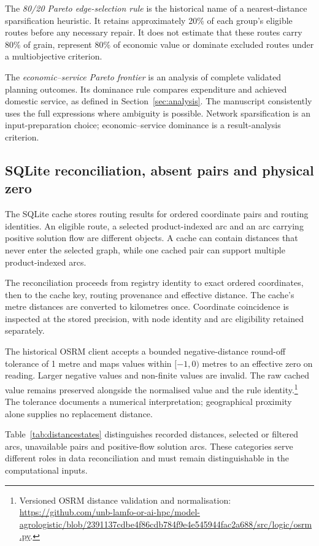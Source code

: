 \documentclass[11pt,a4paper]{article}
\newcommand{\technical}[2]{\footnote{#1: \url{#2}.}}
\begin{document}
The \emph{80/20 Pareto edge-selection rule} is the historical name of a nearest-distance sparsification heuristic. It retains approximately 20\% of each group's eligible routes before any necessary repair. It does not estimate that these routes carry 80\% of grain, represent 80\% of economic value or dominate excluded routes under a multiobjective criterion.

The \emph{economic--service Pareto frontier} is an analysis of complete validated planning outcomes. Its dominance rule compares expenditure and achieved domestic service, as defined in Section~\ref{sec:analysis}. The manuscript consistently uses the full expressions where ambiguity is possible. Network sparsification is an input-preparation choice; economic--service dominance is a result-analysis criterion.

\subsection{SQLite reconciliation, absent pairs and physical zero}

The SQLite cache stores routing results for ordered coordinate pairs and routing identities. An eligible route, a selected product-indexed arc and an arc carrying positive solution flow are different objects. A cache can contain distances that never enter the selected graph, while one cached pair can support multiple product-indexed arcs.

The reconciliation proceeds from registry identity to exact ordered coordinates, then to the cache key, routing provenance and effective distance. The cache's metre distances are converted to kilometres once. Coordinate coincidence is inspected at the stored precision, with node identity and arc eligibility retained separately.

The historical OSRM client accepts a bounded negative-distance round-off tolerance of 1 metre and maps values within $[-1,0)$ metres to an effective zero on reading. Larger negative values and non-finite values are invalid. The raw cached value remains preserved alongside the normalised value and the rule identity.\technical{Versioned OSRM distance validation and normalisation}{https://github.com/unb-lamfo-or-ai-hpc/model-agrologistic/blob/2391137cdbe4f86cdb784f9e4e545944fac2a688/src/logic/osrm.py} The tolerance documents a numerical interpretation; geographical proximity alone supplies no replacement distance.

Table~\ref{tab:distancestates} distinguishes recorded distances, selected or filtered arcs, unavailable pairs and positive-flow solution arcs. These categories serve different roles in data reconciliation and must remain distinguishable in the computational inputs.
\end{document}
